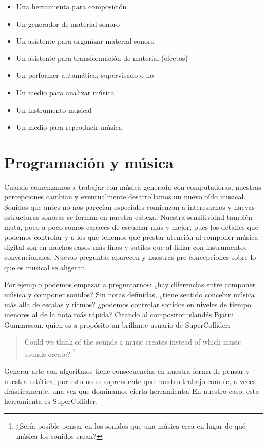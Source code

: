 \begin{itemize}
\item Una herramienta para composición
\item Un generador de material sonoro
\item Un asistente para organizar material sonoro
\item Un asistente para transformación de material (efectos)
\item Un performer automático, supervisado o no
\item Un medio para analizar música 
\item Un instrumento musical 
\item Un medio para reproducir música
\end{itemize}

\section{Programación y música}

Cuando comenzamos a trabajar con música generada con computadoras, nuestras percepciones cambian y eventualmente desarrollamos un nuevo oído musical. Sonidos que antes no nos parecían especiales comienzan a interesarnos y nuevas estructuras sonoras se forman en nuestra cabeza. Nuestra sensitividad también muta, poco a poco somos capaces de escuchar más y mejor, pues los detalles que podemos controlar y a los que tenemos que prestar atención al componer música digital son en muchos casos más finos y sutiles que al lidiar con instrumentos convencionales. Nuevas preguntas aparecen y nuestras pre-concepciones sobre lo que es musical se aligeran. 

Por ejemplo podemos empezar a preguntarnos: ¿hay diferencias entre componer música y componer sonidos? Sin notas definidas, ¿tiene sentido concebir música más alla de escalas y ritmos? ¿podemos controlar sonidos en niveles de tiempo menores al de la nota más rápida? Citando al compositor islandés Bjarni Gunnarsson, quien es a propósito un brillante usuario de SuperCollider:

\begin{quote}
Could we think of the sounds a music creates instead of which music sounds create? \footnote{¿Sería posible pensar en los sonidos que una música crea en lugar de qué música los sonidos crean?}
\end{quote}

Generar arte con algoritmos tiene consecuencias en nuestra forma de pensar y nuestra estética, por esto no es soprendente que nuestro trabajo cambie, a veces drásticamente, una vez que dominamos cierta herramienta. En nuestro caso, esta herramienta es SuperCollider.


